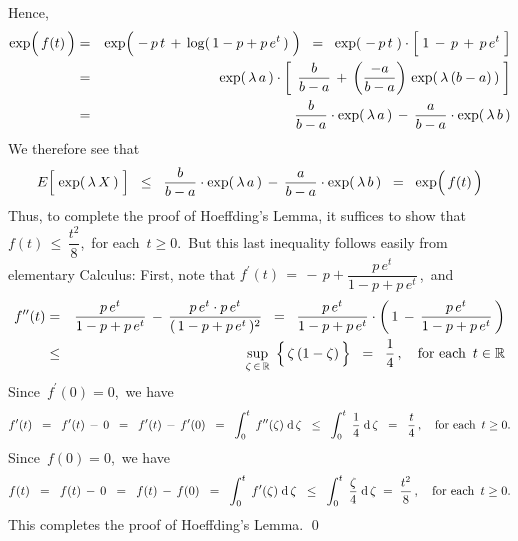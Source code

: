 Hence,
\begin{eqnarray*}
\exp\!\left(\,\overset{{\color{white}.}}{f}(t)\,\right)
&=&
	\exp\!\left(\;
		-\,p\,t \,\overset{{\color{white}.}}{+}\, \log(\,1-p+p\,e^{t}\,)
		\;\right)
\;\; = \;\;
	\exp\!\left(\;-\,p\,t \;\right) \cdot \left[\; 1 \,-\, p \,\overset{{\color{white}.}}{+}\, p\,e^{t} \;\right]
\\
&=&
	\exp\!\left(\, \lambda\,a \,\right)
	\cdot
	\left[\;\,
		\dfrac{b}{b-a}
		\,\overset{{\color{white}.}}{+}\,
		\left(\dfrac{-a}{b-a}\right)\,\exp(\,\lambda\,(b-a)\,)
		\;\right]
\\
&=&
	\dfrac{b}{b-a} \cdot \exp\!\left(\,\lambda\,a\,\right)
	\, - \,
	\dfrac{a}{b-a} \cdot \exp\!\left(\,\lambda\,b\,\right)
\end{eqnarray*}
We therefore see that
\begin{equation*}
E\!\left[\;\overset{{\color{white}-}}{\exp}\!\left(\,\lambda\,X\,\right)\;\right]
\;\; \leq \;\;
	\dfrac{b}{b-a} \cdot \exp\!\left(\,\lambda\,a\,\right)
	\, - \,
	\dfrac{a}{b-a} \cdot \exp\!\left(\,\lambda\,b\,\right)
\;\; = \;\;
	\exp\!\left(\,\overset{{\color{white}.}}{f}(t)\,\right)
\end{equation*}
Thus, to complete the proof of Hoeffding's Lemma, it suffices to show that
\,$f(t) \,\leq\, \dfrac{t^{2}}{8}$,\, for each \,$t \geq 0$.\,
But this last inequality follows easily from elementary Calculus:
First, note that
$f^{\prime}(t)\,=\,-\,p+\dfrac{p\,e^{t}}{1-p+p\,e^{t}}$\,,\, and
\begin{eqnarray*}
f^{\prime\prime}(t)
& = &
	\dfrac{p\,e^{t}}{1 - p + p\,e^{t}}
	\,-\,
	\dfrac{p\,e^{t} \cdot p\,e^{t}}{(\,1 - p + p\,e^{t}\,)^{2}}
\;\; = \;\;
	\dfrac{p\,e^{t}}{1 - p + p\,e^{t}}
	\cdot
	\left(\,1 \,-\, \dfrac{p\,e^{t}}{1 - p + p\,e^{t}}\,\right)
\\
& \leq &
	\underset{\zeta\,\in\,\Re}{\sup}\;\left\{\,\zeta\,(1\overset{{\color{white}.}}{-}\zeta)\,\right\}
\;\; = \;\;
	\dfrac{1}{4}\,,
	\quad\textnormal{for each \,$t \in \Re$}
\end{eqnarray*}
Since \,$f^{\prime}(0) = 0$,\, we have
\begin{equation*}
f^{\prime}(t)
\;\; = \;\;
	f^{\prime}(t) \,-\, 0
\;\; = \;\;
	f^{\prime}(t) \,-\, f^{\prime}(0)
\;\; = \;\;
	\int^{t}_{0}\; f^{\prime\prime}(\zeta) \;\textnormal{d}\,\zeta
\;\; \leq \;\;
	\int^{t}_{0}\;\dfrac{1}{4}\;\textnormal{d}\,\zeta
\;\; = \;\;
	\dfrac{t}{4}\,,
\quad\textnormal{for each \,$t \geq 0$}.
\end{equation*}
Since \,$f(0) = 0$,\, we have
\begin{equation*}
f(t)
\;\; = \;\;
	f(t) \,-\, 0
\;\; = \;\;
	f(t) \,-\, f(0)
\;\; = \;\;
	\int^{t}_{0}\; f^{\prime}(\zeta) \;\textnormal{d}\,\zeta
\;\; \leq\;\;
	\int^{t}_{0}\;\dfrac{\zeta}{4}\;\textnormal{d}\,\zeta
\; = \;
	\dfrac{t^{2}}{8}\,,
\quad\textnormal{for each \,$t \geq 0$}.
\end{equation*}
This completes the proof of Hoeffding's Lemma.
\qed

